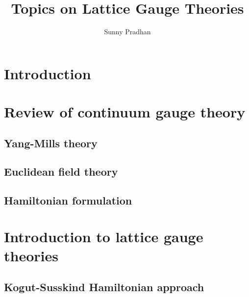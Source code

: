 \documentclass{book}
\author{Sunny Pradhan}
\title{Topics on Lattice Gauge Theories}
\date{}
\begin{document}
\maketitle

\tableofcontents


\chapter*{Introduction}
\label{chap:introduction}



\chapter{Review of continuum gauge theory}
\label{chap:review_of_continuum_gauge_theory}

\section{Yang-Mills theory}
\label{sec:yang_mills_theory}

\section{Euclidean field theory}
\label{sec:euclidean_field_theory}


\section{Hamiltonian formulation}
\label{sec:hamiltonian_formulation}



\chapter{Introduction to lattice gauge theories}
\label{chap:introduction_to_lattice_gauge_theories}


\section{Kogut-Susskind Hamiltonian approach}
\label{sec:kogut_susskind_approach}
\end{document}

